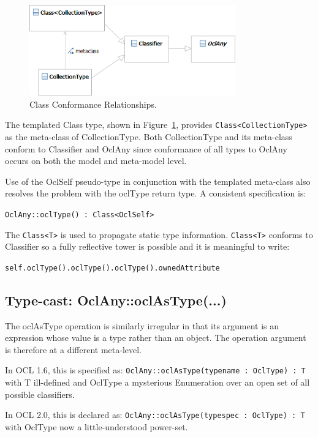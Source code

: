\documentclass{eceasst}
\begin{document}
\begin{figure}
  \begin{center}
    \includegraphics[width=3.5in]{Class.png}
  \end{center}
  \caption{Class Conformance Relationships.}
  \label{fig:Class}
\end{figure}

The templated Class type, shown in Figure~\ref{fig:Class}, provides \verb|Class<CollectionType>| as the meta-class of CollectionType. Both CollectionType and its meta-class conform to Classifier and OclAny since conformance of all types to OclAny occurs on  both the model and meta-model level. 

Use of the OclSelf pseudo-type in conjunction with the templated meta-class also resolves the problem with the oclType return type. A consistent specification is:

\verb!OclAny::oclType() : Class<OclSelf>!

The \verb!Class<T>! is used to propagate static type information. \verb!Class<T>! conforms to Classifier so a fully reflective tower is possible and it is meaningful to write:

 \verb!self.oclType().oclType().oclType().ownedAttribute!

\subsection{Type-cast: OclAny::oclAsType(...)}

The oclAsType operation is similarly irregular in that its argument is an expression whose value is a type rather than an object. The operation argument is therefore at a different meta-level.

In OCL 1.6, this is specified as: \verb!OclAny::oclAsType(typename : OclType) : T!  with T ill-defined and OclType a mysterious Enumeration over an open set of all possible classifiers.

In OCL 2.0, this is declared as: \verb!OclAny::oclAsType(typespec : OclType) : T! with OclType now a little-understood power-set.
\end{document}
